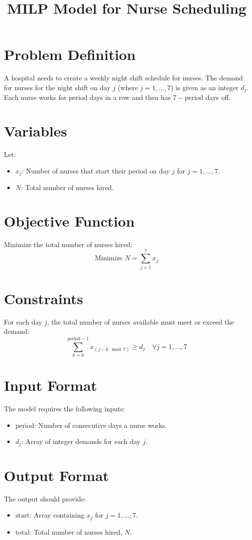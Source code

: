 \documentclass{article}
\begin{document}
\title{MILP Model for Nurse Scheduling}
\author{}
\date{}
\maketitle

\section{Problem Definition}
A hospital needs to create a weekly night shift schedule for nurses. The demand for nurses for the night shift on day \( j \) (where \( j = 1, \ldots, 7 \)) is given as an integer \( d_j \). Each nurse works for \( \text{period} \) days in a row and then has \( 7 - \text{period} \) days off.

\section{Variables}
Let:
\begin{itemize}
    \item \( x_j \): Number of nurses that start their period on day \( j \) for \( j = 1, \ldots, 7 \).
    \item \( N \): Total number of nurses hired.
\end{itemize}

\section{Objective Function}
Minimize the total number of nurses hired:
\[
\text{Minimize } N = \sum_{j=1}^{7} x_j
\]

\section{Constraints}
For each day \( j \), the total number of nurses available must meet or exceed the demand:
\[
\sum_{k=0}^{\text{period}-1} x_{(j-k \mod 7)} \geq d_j \quad \forall j = 1, \ldots, 7
\]

\section{Input Format}
The model requires the following inputs:
\begin{itemize}
    \item \( \text{period} \): Number of consecutive days a nurse works.
    \item \( d_j \): Array of integer demands for each day \( j \).
\end{itemize}

\section{Output Format}
The output should provide:
\begin{itemize}
    \item \( \text{start} \): Array containing \( x_j \) for \( j = 1, \ldots, 7 \).
    \item \( \text{total} \): Total number of nurses hired, \( N \).
\end{itemize}
\end{document}
